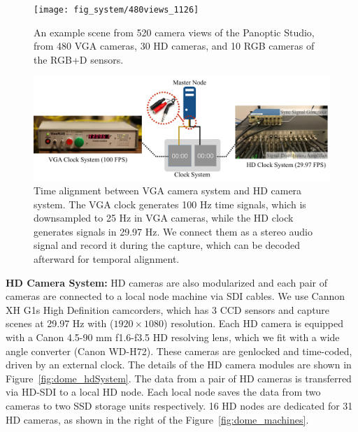\begin{figure}
	\centering       
	\texttt{[image: fig\_system/480views\_1126]}
	\caption{An example scene from 520 camera views of the Panoptic Studio, from 480 VGA cameras, 30 HD cameras, and 10 RGB cameras of the RGB+D sensors.}
	\label{fig:dome_exampleScene}
\end{figure}

\begin{figure}
	\centering       
	\includegraphics[trim=0 0 0 0,clip,width=\linewidth]{fig_system/dome_syncSystem}
	\caption{Time alignment between VGA camera system and HD camera system. The VGA clock generates 100 Hz time signals, which is downsampled to 25 Hz in VGA cameras, while the HD clock generates signals in 29.97 Hz. We connect them as a stereo audio signal and record it during the capture, which can be decoded afterward for temporal alignment.}
	\label{fig:dome_syncSystem}
\end{figure}
\noindent \textbf{HD Camera System:} HD cameras are also modularized and each pair of cameras are connected to a local node machine via SDI cables. We use Cannon XH G1s High Definition camcorders, which has 3 CCD sensors and capture scenes at 29.97 Hz with ($1920{\times}1080$) resolution. Each HD camera is equipped with a Canon 4.5-90 mm f1.6-f3.5 HD resolving lens, which we fit with a wide angle converter (Canon WD-H72). These cameras are genlocked and time-coded, driven by an external clock. The details of the HD camera modules are shown in Figure~\ref{fig:dome_hdSystem}. The data from a pair of HD cameras is transferred via HD-SDI to a local HD node. Each local node saves the data from two cameras to two SSD storage units respectively. 16 HD nodes are dedicated for 31 HD cameras, as shown in the right of the Figure~\ref{fig:dome_machines}.


